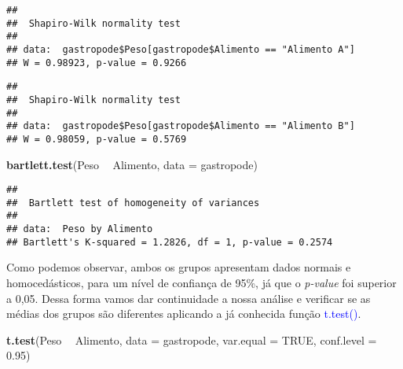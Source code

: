 \documentclass[14pt,titlepage, oneside, openany, a4paper]{book}
\newenvironment{Shaded}{\begin{snugshade}}{\end{snugshade}}
\newcommand{\DataTypeTok}[1]{\textcolor[rgb]{0.13,0.29,0.53}{#1}}
\newcommand{\FloatTok}[1]{\textcolor[rgb]{0.00,0.00,0.81}{#1}}
\newcommand{\KeywordTok}[1]{\textcolor[rgb]{0.13,0.29,0.53}{\textbf{#1}}}
\newcommand{\NormalTok}[1]{#1}
\newcommand{\OperatorTok}[1]{\textcolor[rgb]{0.81,0.36,0.00}{\textbf{#1}}}
\newcommand{\OtherTok}[1]{\textcolor[rgb]{0.56,0.35,0.01}{#1}}
\newcommand{\StringTok}[1]{\textcolor[rgb]{0.31,0.60,0.02}{#1}}
\begin{document}
\begin{verbatim}
## 
##  Shapiro-Wilk normality test
## 
## data:  gastropode$Peso[gastropode$Alimento == "Alimento A"]
## W = 0.98923, p-value = 0.9266
\end{verbatim}

\begin{Shaded}
\end{Shaded}

\begin{verbatim}
## 
##  Shapiro-Wilk normality test
## 
## data:  gastropode$Peso[gastropode$Alimento == "Alimento B"]
## W = 0.98059, p-value = 0.5769
\end{verbatim}

\begin{Shaded}
\begin{Highlighting}[]
\KeywordTok{bartlett.test}\NormalTok{(Peso }\OperatorTok{~}\StringTok{ }\NormalTok{Alimento, }\DataTypeTok{data =}\NormalTok{ gastropode)}
\end{Highlighting}
\end{Shaded}

\begin{verbatim}
## 
##  Bartlett test of homogeneity of variances
## 
## data:  Peso by Alimento
## Bartlett's K-squared = 1.2826, df = 1, p-value = 0.2574
\end{verbatim}

Como podemos observar, ambos os grupos apresentam dados normais e homocedásticos, para um nível de confiança de 95\%, já que o \emph{p-value} foi superior a 0,05. Dessa forma vamos dar continuidade a nossa análise e verificar se as médias dos grupos são diferentes aplicando a já conhecida função \textcolor{blue}{t.test()}.

\begin{Shaded}
\begin{Highlighting}[]
\KeywordTok{t.test}\NormalTok{(Peso }\OperatorTok{~}\StringTok{ }\NormalTok{Alimento, }
       \DataTypeTok{data =}\NormalTok{ gastropode,}
       \DataTypeTok{var.equal =} \OtherTok{TRUE}\NormalTok{,}
       \DataTypeTok{conf.level =} \FloatTok{0.95}\NormalTok{)}
\end{Highlighting}
\end{Shaded}
\end{document}
